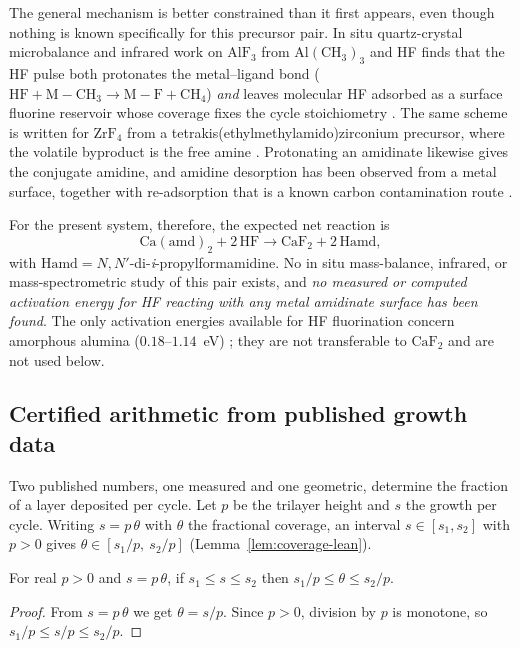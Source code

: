 The general mechanism is better constrained than it first appears, even though
nothing is known specifically for this precursor pair. In situ quartz-crystal
microbalance and infrared work on $\mathrm{AlF_3}$ from $\mathrm{Al(CH_3)_3}$ and
HF finds that the HF pulse both protonates the metal--ligand bond
($\mathrm{HF}+\mathrm{M{-}CH_3}\to\mathrm{M{-}F}+\mathrm{CH_4}$) \emph{and}
leaves molecular HF adsorbed as a surface fluorine reservoir whose coverage
fixes the cycle stoichiometry \citep{Lee2015}. The same scheme is written for
$\mathrm{ZrF_4}$ from a tetrakis(ethylmethylamido)zirconium precursor, where the
volatile byproduct is the free amine \citep{Lee2016}. Protonating an amidinate
likewise gives the conjugate amidine, and amidine desorption has been observed
from a metal surface, together with re-adsorption that is a known carbon
contamination route \citep{Ma2011}.

For the present system, therefore, the expected net reaction is
\[
\mathrm{Ca(amd)_2} + 2\,\mathrm{HF}
  \longrightarrow \mathrm{CaF_2} + 2\,\mathrm{Hamd},
\]
with $\mathrm{Hamd} = N,N'$-di-\emph{i}-propylformamidine. No in situ
mass-balance, infrared, or mass-spectrometric study of this pair exists, and
\emph{no measured or computed activation energy for HF reacting with any metal
amidinate surface has been found}. The only activation energies available for
HF fluorination concern amorphous alumina
($0.18$--$1.14$~eV) \citep{Khumaini2025}; they are not transferable to
$\mathrm{CaF_2}$ and are not used below.

\subsection{Certified arithmetic from published growth data}

Two published numbers, one measured and one geometric, determine the fraction
of a layer deposited per cycle. Let $p$ be the trilayer height and $s$ the
growth per cycle. Writing $s = p\,\theta$ with $\theta$ the fractional coverage, an
interval $s\in[s_1,s_2]$ with $p>0$ gives $\theta\in[s_1/p,\ s_2/p]$
(Lemma~\ref{lem:coverage-lean}).

\begin{lemma}
\label{lem:coverage-lean}
For real $p>0$ and $s=p\,\theta$, if $s_1\le s\le s_2$ then
$s_1/p\le \theta\le s_2/p$.
\end{lemma}
\begin{proof}
From $s=p\,\theta$ we get $\theta=s/p$. Since $p>0$, division by $p$ is monotone, so
$s_1/p\le s/p\le s_2/p$.
\end{proof}

